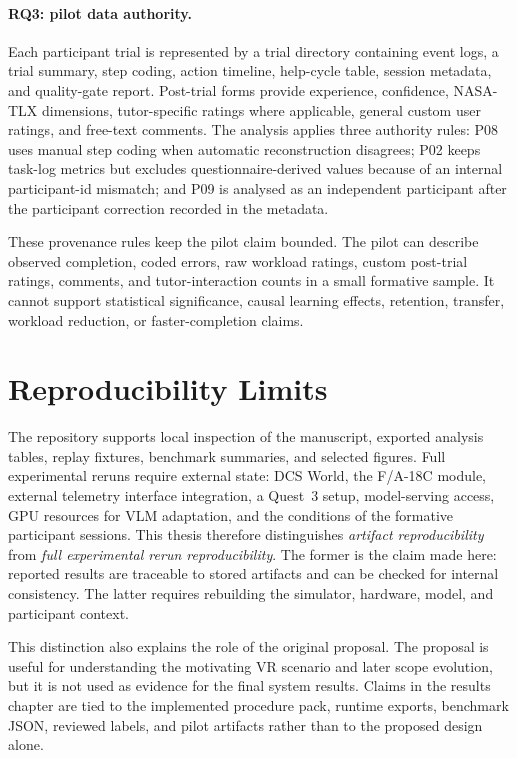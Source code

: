 \paragraph{RQ3: pilot data authority.}
Each participant trial is represented by a trial directory containing event
logs, a trial summary, step coding, action timeline, help-cycle table, session
metadata, and quality-gate report. Post-trial forms provide experience,
confidence, NASA-TLX dimensions, tutor-specific ratings where applicable,
general custom user ratings, and free-text comments. The analysis applies
three authority rules: P08 uses manual step coding when automatic
reconstruction disagrees; P02 keeps task-log metrics but excludes
questionnaire-derived values because of an internal participant-id mismatch;
and P09 is analysed as an independent participant after the participant
correction recorded in the metadata.

These provenance rules keep the pilot claim bounded. The pilot can describe
observed completion, coded errors, raw workload ratings, custom post-trial
ratings, comments, and tutor-interaction counts in a small formative sample.
It cannot
support statistical significance, causal learning effects, retention, transfer,
workload reduction, or faster-completion claims.

\section{Reproducibility Limits}\label{sec:impl-repro-limits}

The repository supports local inspection of the manuscript, exported analysis
tables, replay fixtures, benchmark summaries, and selected figures. Full
experimental reruns require external state: DCS World, the F/A-18C module,
external telemetry interface integration, a Quest~3 setup, model-serving access, GPU resources for
VLM adaptation, and the conditions of the formative participant sessions.
This thesis therefore distinguishes \emph{artifact reproducibility} from
\emph{full experimental rerun reproducibility}. The former is the claim made
here: reported results are traceable to stored artifacts and can be checked for
internal consistency. The latter requires rebuilding the simulator, hardware,
model, and participant context.

This distinction also explains the role of the original proposal. The proposal
is useful for understanding the motivating VR scenario and later scope
evolution, but it is not used as evidence for the final system results. Claims
in the results chapter are tied to the implemented procedure pack, runtime
exports, benchmark JSON, reviewed labels, and pilot artifacts rather than to
the proposed design alone.
